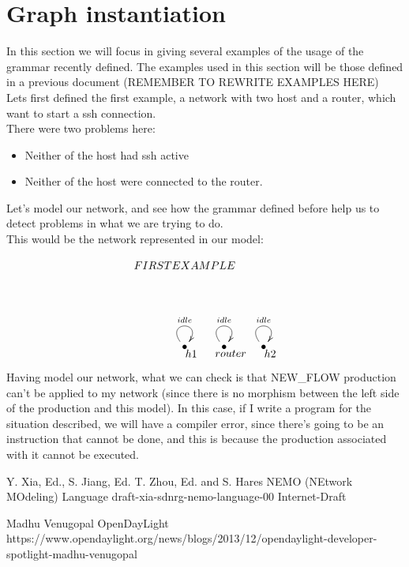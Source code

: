 \documentclass[envcountsect,runningheads]{llncs}
\begin{document}
\section{Graph instantiation}

In this section we will focus in giving several examples of the usage of the 
grammar recently defined. The examples used in this section will be those defined in 
a previous document (REMEMBER TO REWRITE EXAMPLES HERE) \\ 
Lets first defined the first example, a network with two host and a router, 
which want to start a ssh connection. \\
There were two problems here:
\begin{itemize}
  \item Neither of the host had ssh active
  \item Neither of the host were connected to the router.
\end{itemize}

Let's model our network, and see how the grammar defined before help us to 
detect problems in what we are trying to do.\\
This would be the network represented in our model:
\begin{figure}[H]
    \[
       \xymatrix@C=25pt@R=30pt
       {
         {}\POS[]-<0pc,0pc>\drop{FIRST EXAMPLE}
         \\
         \\
         {\bullet}\ar@(ul,ur)^{idle} \POS[]-<-.5pc,.5pc> \drop{h1} &
         {\bullet}\ar@(ul,ur)^{idle} \POS[]-<-.5pc,.5pc> \drop{router} &
         {\bullet}\ar@(ul,ur)^{idle} \POS[]-<-.5pc,.5pc> \drop{h2}
      }
    \]
\end{figure}

Having model our network, what we can check is that NEW\_FLOW production can't be 
applied to my network (since there is no morphism between the left side of the production 
and this model). In this case, if I write a program for the situation described, 
we will have a compiler error, since there's going to be an instruction that 
cannot be done, and this is because the production associated with it cannot be 
executed.

\begin{thebibliography}{10}

Y. Xia, Ed., S. Jiang, Ed. T. Zhou, Ed. and S. Hares
\newblock NEMO (NEtwork MOdeling) Language draft-xia-sdnrg-nemo-language-00
\newblock Internet-Draft

Madhu Venugopal
\newblock OpenDayLight https://www.opendaylight.org/news/blogs/2013/12/opendaylight-developer-spotlight-madhu-venugopal 



 
\end{thebibliography}
\end{document}
